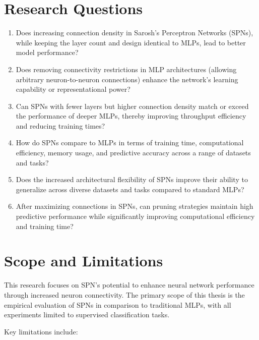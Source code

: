 \section{Research Questions}

\begin{enumerate}[label={RQ\arabic*.}, leftmargin=*]
    \item Does increasing connection density in Sarosh’s Perceptron Networks (SPNs), while keeping the layer count and design identical to MLPs, lead to better model performance? \label{RQ1}
    \item Does removing connectivity restrictions in MLP architectures (allowing arbitrary neuron-to-neuron connections) enhance the network’s learning capability or representational power? \label{RQ2}
    \item Can SPNs with fewer layers but higher connection density match or exceed the performance of deeper MLPs, thereby improving throughput efficiency and reducing training times? \label{RQ3}
    \item How do SPNs compare to MLPs in terms of training time, computational efficiency, memory usage, and predictive accuracy across a range of datasets and tasks? \label{RQ4}
    \item Does the increased architectural flexibility of SPNs improve their ability to generalize across diverse datasets and tasks compared to standard MLPs? \label{RQ5}
    \item After maximizing connections in SPNs, can pruning strategies maintain high predictive performance while significantly improving computational efficiency and training time? \label{RQ6}
\end{enumerate}


\section{Scope and Limitations}

This research focuses on SPN's potential to enhance neural network performance through increased neuron connectivity. The primary scope of this thesis is the empirical evaluation of SPNs in comparison to traditional MLPs, with all experiments limited to supervised classification tasks.

Key limitations include:

